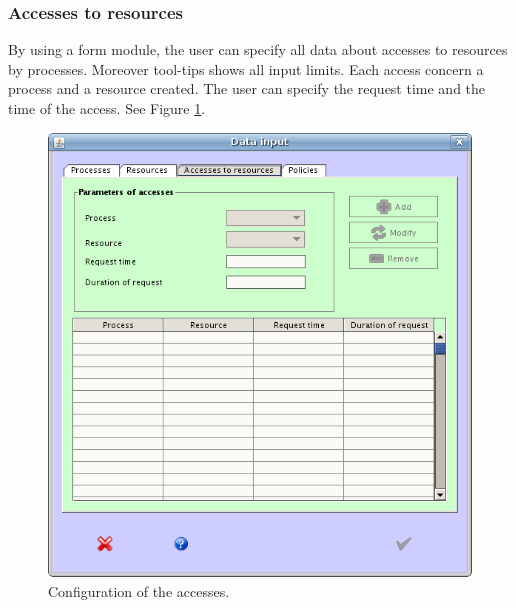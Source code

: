 \documentclass[10pt,a4paper,twoside,titlepage]{article}
\begin{document}
\subsubsection{Accesses to resources}
\label{subsubsec:accesses_to_resources}
By using a form module, the user can specify all data about accesses to resources by processes. Moreover tool-tips shows all input limits. Each access concern a process and a resource created. The user can specify the request time and the time of the access. See Figure \ref{fig:config_accesses}.
\begin{figure}[tb]
	\begin{center}
		\includegraphics[scale=0.6]{config_accesses}
		\caption[Configuration of the accesses]{Configuration of the accesses.}
		\label{fig:config_accesses}
	\end{center}
\end{figure}
\end{document}
